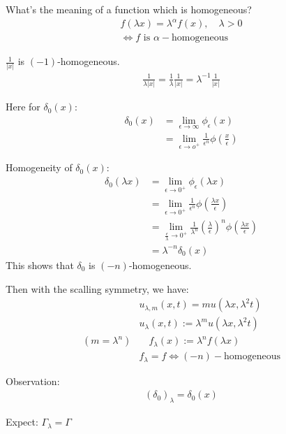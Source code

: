 \documentclass[11pt]{article}
\begin{document}
What's the meaning of a function which is homogeneous?
\begin{align*}
    f(\lambda x) = \lambda^{\alpha}f(x) ,\quad \lambda>0\\
    \iff f \text{ is }\alpha-\text{homogeneous}
\end{align*}

\begin{example}
    $\frac{1}{|x|}$ is $(-1)$-homogeneous.
    \begin{align*}
        \frac{1}{\lambda |x|} = \frac{1}{\lambda} \frac{1}{|x|} = \lambda^{-1} \frac{1}{|x|}
    \end{align*}
\end{example}

Here for $\delta_0(x)$:
\begin{align*}
    \delta_{0}(x) &= \lim_{\epsilon \to \infty} \phi_{\epsilon}(x) \\
    &= \lim_{\epsilon \to o^{+}} \frac{1}{\epsilon^{n}}\phi(\frac{x}{\epsilon})
\end{align*}

Homogeneity of $\delta_0(x)$:
\begin{align*}
    \delta_0(\lambda x) &= \lim_{\epsilon \to 0^{+}} \phi_{\epsilon}(\lambda x)\\
     &= \lim_{\epsilon \to 0^{+}} \frac{1}{\epsilon^{n}}\phi(\frac{\lambda x }{\epsilon})\\
     &= \lim_{\frac{\epsilon}{\lambda} \to 0^{+}}\frac{1}{\lambda^{n}}(\frac{\lambda}{\epsilon})^{n}
        \phi(\frac{\lambda x }{\epsilon}) \\
    &= \lambda^{-n}\delta_0(x)
\end{align*}
This shows that $\delta_0$ is $(-n)$-homogeneous.

Then with the scalling symmetry, we have:
\begin{align*}
    &u_{\lambda,m}(x,t) = mu (\lambda x, \lambda^{2}t)\\
    &u_{\lambda}(x,t) := \lambda^{m}u(\lambda x, \lambda^{2}t)\\
    (m = \lambda^{n}) &\quad f_{\lambda}(x) := \lambda^{n}f(\lambda x)\\
    &f_{\lambda} = f \iff (-n)-\text{homogeneous}
\end{align*}

Observation:
\begin{align*}
    (\delta_0)_{\lambda} = \delta_0(x)
\end{align*}

Expect: $\Gamma_{\lambda} = \Gamma$
\end{document}
